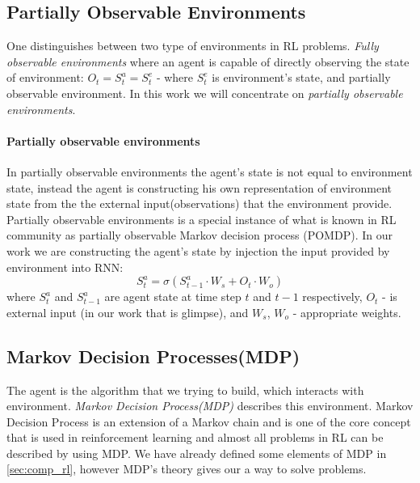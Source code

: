 \subsection{Partially Observable Environments}
One distinguishes between two type of environments in RL problems.
\emph{Fully observable environments} where an agent is capable of directly
observing the state of environment:
$O_t = S_t^a = S_t^e$ - where $S_t^e$ is environment's state,
and partially observable environment. In this work we will concentrate
on \emph{partially observable environments}.

\paragraph{Partially observable environments}
In partially observable environments the agent's state is not equal to environment state,
instead the agent is constructing his own representation of environment state from
the the external input(observations) that the environment provide.
Partially observable environments is a special instance of what is known in RL community
as partially observable Markov decision process (POMDP). In our work we are constructing
the agent's state by injection the input provided by environment into RNN:
\begin{equation} \label{eq:rnn_state}
	S_t^a = \sigma(S_{t-1}^a \cdot W_s + O_t \cdot W_o)
\end{equation}
where $S_t^a$ and $S_{t-1}^a$ are agent state at time step $t$ and $t-1$
respectively, $O_t$ - is external input (in our work that is glimpse),
and $W_s$, $W_o$ - appropriate weights.



\subsection{Markov Decision Processes(MDP)} \label{subs:reward_process}
The agent is the algorithm that we trying to build, which interacts with
environment. \emph{Markov Decision Process(MDP)} describes this environment.
Markov Decision Process is an extension of a Markov chain and is one of the core
concept that is used in reinforcement learning and almost all problems in RL
can be described by using MDP. We have already defined some elements of MDP in \autoref{sec:comp_rl},
however MDP's theory gives our a way to solve problems.


